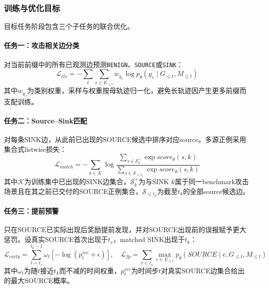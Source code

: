 \subsubsection{训练与优化目标}

目标任务阶段包含三个子任务的联合优化。

\paragraph{任务一：攻击相关边分类}
对当前前缀中的所有已观测边预测\texttt{BENIGN}、\texttt{SOURCE}或\texttt{SINK}：
\begin{equation}
  \mathcal{L}_{cls} = -\sum_{t}\sum_{e \in E_{\le t}} w_{y_e} \log p_{\theta}(y_e \mid G_{\le t}, M_{\le t})
  \label{eq:cls_loss}
\end{equation}
其中$w_{y_e}$为类别权重，采样与权重按母轨迹归一化，避免长轨迹因产生更多前缀而支配训练。

\paragraph{任务二：Source--Sink匹配}
对每条SINK边，从此前已出现的SOURCE候选中排序对应source。多源正例采用集合式listwise损失：
\begin{equation}
  \mathcal{L}_{match} = -\sum_{k \in \mathcal{K}} \log \frac{\sum_{s \in \mathcal{S}_k^{+}} \exp score_{\theta}(s, k)}{\sum_{s \in \mathcal{S}_{\le t_k}} \exp score_{\theta}(s, k)}
  \label{eq:match_loss}
\end{equation}
其中$\mathcal{K}$为训练集中已出现的SINK边集合，$\mathcal{S}_k^{+}$为与SINK $k$属于同一benchmark攻击场景且在其之前已交付的SOURCE正例集合，$\mathcal{S}_{\le t_k}$为截至$t_k$的全部source候选边。

\paragraph{任务三：提前预警}
只在SOURCE已实际出现后奖励提前发现，并对SOURCE出现前的误报赋予更大惩罚。设真实SOURCE首次出现于$t_s$，matched SINK出现于$t_k$：
\begin{equation}
  \mathcal{L}_{early} = \sum_{t=t_s}^{t_k-1} \omega_t \left[-\log(p^{src}_t + \epsilon)\right],\quad
  \mathcal{L}_{fp} = \sum_{t<t_s} \max_{e \in E_{\le t}} p_{\theta}(SOURCE \mid e, G_{\le t}, M_{\le t})
  \label{eq:early_loss}
\end{equation}
其中$\omega_t$为随$t$接近$t_k$而不减的时间权重，$p^{src}_t$为时间步$t$对真实SOURCE边集合给出的最大SOURCE概率。


